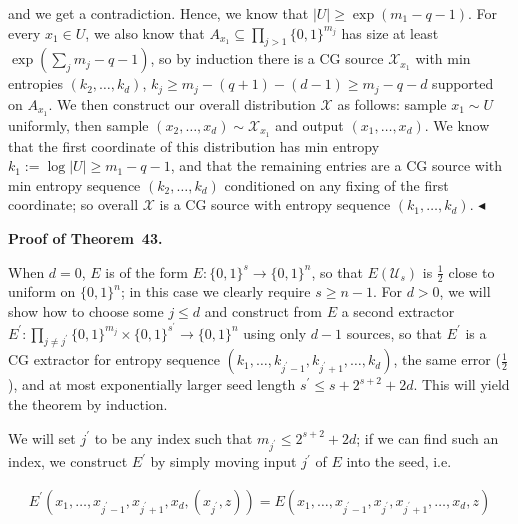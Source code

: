 \documentclass[10pt,a4paper]{article}
\begin{document}
and we get a contradiction. Hence, we know that $|U|\geq\exp(m_{1}-q-1)$. For every $x_{1}\in U$, we also know that $A_{x_{1}}\subseteq\prod_{j>1}\{0,1\}^{m_{j}}$ has size at least $\exp(\sum_{j}m_{j}-q-1)$, so by induction there is a CG source $\mathcal{X}_{x_{1}}$ with min entropies $(k_{2},\ldots,k_{d})$, $k_{j}\geq m_{j}-(q+1)-(d-1)\geq m_{j}-q-d$ supported on $A_{x_{1}}$. We then construct our overall distribution $\mathcal{X}$ as follows: sample $x_{1}\sim U$ uniformly, then sample $(x_{2},\ldots,x_{d})\sim\mathcal{X}_{x_{1}}$ and output $(x_{1},\ldots,x_{d})$. We know that the first coordinate of this distribution has min entropy $k_{1}:=\log|U|\geq m_{1}-q-1$, and that the remaining entries are a CG source with min entropy sequence $(k_{2},\ldots,k_{d})$ conditioned on any fixing of the first coordinate; so overall $\mathcal{X}$ is a CG source with entropy sequence $(k_{1},\ldots,k_{d})$.
$\blacktriangleleft$\par





\par\medskip\noindent\textbf{Proof of Theorem 43.}\par




When $d=0$, $E$ is of the form $E:\{0,1\}^{s}\to\{0,1\}^{n}$, so that $E(\mathcal{U}_{s})$ is $\frac{1}{2}$ close to uniform on $\{0,1\}^{n}$; in this case we clearly require $s\geq n-1$. For $d>0$, we will show how to choose some $j\leq d$ and construct from $E$ a second extractor $E^{\prime}:\prod_{j\neq j^{\prime}}\{0,1\}^{m_{j}}\times\{0,1\}^{s^{\prime}}\to\{0,1\}^{n}$ using only $d-1$ sources, so that $E^{\prime}$ is a CG extractor for entropy sequence $(k_{1},\ldots,k_{j^{\prime}-1},k_{j^{\prime}+1},\ldots,k_{d})$, the same error ($\frac{1}{2}$), and at most exponentially larger seed length $s^{\prime}\leq s+2^{s+2}+2d$. This will yield the theorem by induction.\par




We will set $j^{\prime}$ to be any index such that $m_{j^{\prime}}\leq 2^{s+2}+2d$; if we can find such an index, we construct $E^{\prime}$ by simply moving input $j^{\prime}$ of $E$ into the seed, i.e.\par


\[\begin{gathered}
E^{\prime}(x_{1},\ldots,x_{j^{\prime}-1},x_{j^{\prime}+1},x_{d},(x_{j^{\prime}},z))=E(x_{1},\ldots,x_{j^{\prime}-1},x_{j^{\prime}},x_{j^{\prime}+1},\ldots,x_{d},z)
\end{gathered}\]
\end{document}
